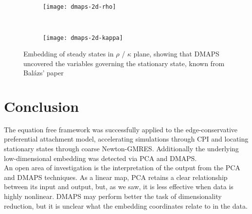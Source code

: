 \documentclass[epjST, final]{svjour}
\begin{document}
\begin{onehalfspace}
\begin{figure}[h!]
  \vspace{-5mm}
  \centering
  \begin{subfigure}{0.75\textwidth}
    \centering
    \texttt{[image: dmaps-2d-rho]}
  \end{subfigure} \\ %
  \begin{subfigure}{0.75\textwidth}
    \centering
    \texttt{[image: dmaps-2d-kappa]}
  \end{subfigure}%
  \caption{Embedding of steady states in $\rho$ / $\kappa$ plane,
    showing that DMAPS uncovered the variables governing the
    stationary state, known from
    Bal\'{a}zs' paper \label{fig:dmaps-rk}}
\end{figure}


\section{Conclusion}

The equation free framework was successfully applied to the edge-conservative preferential attachment model, accelerating simulations through CPI and locating stationary states through coarse Newton-GMRES. Additionally the underlying low-dimensional embedding was detected via PCA and DMAPS. \\

An open area of investigation is the interpretation of the output from the PCA and DMAPS techniques. As a linear map, PCA retains a clear relationship between its input and output, but, as we saw, it is less effective when data is highly nonlinear. DMAPS may perform better the task of dimensionality reduction, but it is unclear what the embedding coordinates relate to in the data.


 




\end{onehalfspace}



\end{document}
